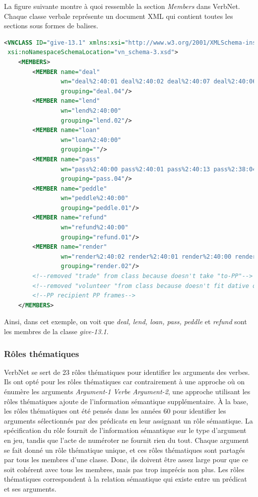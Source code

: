 La figure suivante montre à quoi ressemble la section \emph{Members} dans VerbNet. Chaque classe verbale représente un document XML qui contient toutes les sections sous formes de balises.

\begin{lstlisting}[language=XML, caption = les membres]
<VNCLASS ID="give-13.1" xmlns:xsi="http://www.w3.org/2001/XMLSchema-instance"
 xsi:noNamespaceSchemaLocation="vn_schema-3.xsd">
    <MEMBERS>
        <MEMBER name="deal" 
				wn="deal%2:40:01 deal%2:40:02 deal%2:40:07 deal%2:40:06" 
				grouping="deal.04"/>
        <MEMBER name="lend" 
				wn="lend%2:40:00" 
				grouping="lend.02"/>
        <MEMBER name="loan" 
				wn="loan%2:40:00" 
				grouping=""/>
        <MEMBER name="pass" 
				wn="pass%2:40:00 pass%2:40:01 pass%2:40:13 pass%2:38:04" 
				grouping="pass.04"/>
        <MEMBER name="peddle" 
				wn="peddle%2:40:00" 
				grouping="peddle.01"/>
        <MEMBER name="refund" 
				wn="refund%2:40:00" 
				grouping="refund.01"/>
        <MEMBER name="render" 
				wn="render%2:40:02 render%2:40:01 render%2:40:00 render%2:40:03" 
				grouping="render.02"/>
        <!--removed "trade" from class because doesn't take "to-PP"-->
        <!--removed "volunteer "from class because doesn't fit dative or-->
        <!--PP recipient PP frames-->
    </MEMBERS>
\end{lstlisting}

Ainsi, dans cet exemple, on voit que \emph{deal, lend, loan, pass, peddle} et \emph{refund} sont les membres de la classe \emph{give-13.1}.

\subsubsection{Rôles thématiques}

VerbNet se sert de 23 rôles thématiques pour identifier les arguments des verbes. Ils ont opté pour les rôles thématiques car contrairement à une approche où on énumère les arguments \emph{Argument-1 Verbe Argument-2}, une approche utilisant les rôles thématiques ajoute de l'information sémantique supplémentaire. À la base, les rôles thématiques ont été pensés dans les années 60 pour identifier les arguments sélectionnés par des prédicats en leur assignant un rôle sémantique. La spécification du rôle fournit de l'information sémantique sur le type d'argument en jeu, tandis que l'acte de numéroter ne fournit rien du tout. Chaque argument se fait donné un rôle thématique unique, et ces rôles thématiques sont partagés par tous les membres d'une classe. Donc, ils doivent être assez large pour que ce soit cohérent avec tous les membres, mais pas trop imprécis non plus. Les rôles thématiques correspondent à la relation sémantique qui existe entre un prédicat et ses arguments.

